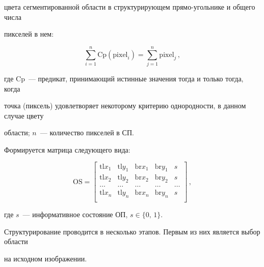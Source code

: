 \pagebreak





\noindent 


цве\-та сегментированной области в структурирующем прямо-\linebreak угольнике и общего числа 


пикселей в нем:


$$


\sum\limits_{i=1}^n \mathrm{Cp}(\mathrm{pixel}_i)=\sum\limits_{j=1}^n \mathrm{pixel}_j\,,


$$


где Cp~--- предикат, принимающий истинные значения тогда и только тогда, когда 


точка (пиксель) удовлетворяет некоторому критерию однородности, в данном случае цвету 


области; $n$~--- количество пикселей в СП.





Формируется матрица следующего вида:


$$


\mathrm{OS}=


\begin{bmatrix}


\mathrm{tl}x_1 & \mathrm{tl}y_1 & \mathrm{br}x_1 & \mathrm{br}y_1 & s\\


\mathrm{tl}x_2 & \mathrm{tl}y_2 & \mathrm{br}x_2 & \mathrm{br}y_2 & s\\


\ldots &\ldots &\ldots &\ldots &\ldots\\


\mathrm{tl}x_n & \mathrm{tl}y_n & \mathrm{br}x_n & \mathrm{br}y_n & s\\


\end{bmatrix}\,,


$$


где  $s$~--- информативное состояние ОП, $s\in \{0,\,1\}$. 





Структурирование проводится в несколько этапов. Первым из них является выбор области 


на исходном изображении.\linebreak\vspace*{-12pt}





